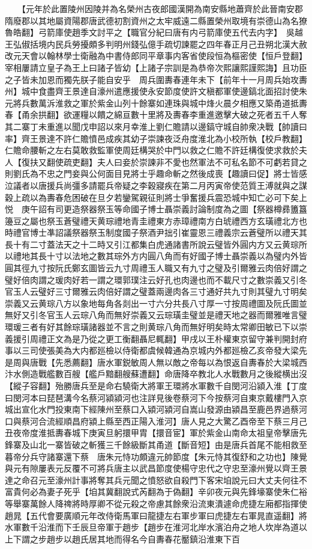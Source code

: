　　【元年於此置陵州因陵并為名榮州古夜郎國漢開為南安縣地蕭齊於此晉南安郡隋廢郡以其地屬資陽郡唐武德初割資州之太牢威遠二縣置榮州取境有崇德山為名獠魯皓翻】弓箭庫使趙季文討平之【職官分紀曰唐有内弓箭庫使五代去内字】　吳越王弘俶括境内民兵勞擾頗多判明州錢弘億手疏切諫罷之四年春正月己丑朔北漢大赦改元天會以翰林學士衛融為中書侍郎同平章事内客省使段恒為樞密使【恒戶登翻】　宰相屢請立皇子為王上曰諸子皆幼【上諸子宗訓是為恭帝次熙讓熙謹熙誨】且功臣之子皆未加恩而獨先朕子能自安乎　周兵圍夀春連年未下【前年十一月周兵始攻夀州】城中食盡齊王景達自濠州遣應援使永安節度使許文稹都軍使邊鎬北面招討使朱元將兵數萬泝淮救之軍於紫金山列十餘寨如連珠與城中烽火晨夕相應又築甬道抵夀春【甬余拱翻】欲運糧以饋之綿亘數十里將及夀春李重進邀擊大破之死者五千人奪其二寨丁未重進以聞戊申詔以來月幸淮上劉仁贍請以邊鎬守城自帥衆决戰【帥讀曰率】齊王景達不許仁贍憤邑成疾其幼子崇諫夜泛舟度淮北為小校所執【校戶教翻】仁贍命腰斬之左右莫敢救監軍使周廷構哭於中門以救之仁贍不許廷構復使求救於夫人【復扶又翻使疏吏翻】夫人曰妾於崇諫非不愛也然軍法不可私名節不可虧若貸之則劉氏為不忠之門妾與公何面目見將士乎趣命斬之然後成喪【趣讀曰促】將士皆感泣議者以唐援兵尚彊多請罷兵帝疑之李穀寢疾在第二月丙寅帝使范質王溥就與之謀穀上疏以為夀春危困破在旦夕若鑾駕親征則將士爭奮援兵震恐城中知亡必可下矣上悦　庚午詔有司更造祭器祭玉等命國子博士聶崇義討論制度為之圖【祭器樽彞簠簋籩豆之屬也祭玉蒼璧禮天黄琮禮地青圭禮東方赤璋禮南方白琥禮西方玄璜禮北方也時禮官博士凖詔議祭器祭玉制度國子祭酒尹拙引崔靈恩三禮義宗云蒼璧所以禮天其長十有二寸蓋法天之十二時又引江都集白虎通諸書所說云璧皆外圓内方又云黄琮所以禮地其長十寸以法地之數其琮外方内圓八角而有好國子博士聶崇義以為璧内外皆圓其徑九寸按阮氏鄭玄圖皆云九寸周禮玉人職又有九寸之璧及引爾雅云肉倍好謂之璧好倍肉謂之瑗肉好若一謂之環郭璞注云好孔也肉邊也而不載尺寸之數崇義又引冬官玉人云璧好三寸爾雅云肉倍好謂之璧蓋兩邊肉各三寸通好共九寸則其璧九寸明矣崇義又云黄琮八方以象地每角各剡出一寸六分共長八寸厚一寸按周禮圖及阮氏圖並無好又引冬官玉人云琮八角而無好崇義又云琮璜圭璧並是禮天地之器而爾雅唯言璧環瑗三者有好其餘琮璜諸器並不言之則黄琮八角而無好明矣時太常卿田敏已下以崇義援引周禮正文為是乃從之更工衡翻聶尼輒翻】甲戌以王朴權東京留守兼判開封府事以三司使張美為大内都廵檢以侍衛都虞候韓通為京城内外都廵檢乙亥帝發大梁先是周與唐戰【先悉薦翻】唐水軍鋭敏周人無以敵之帝每以為恨返自夀春於大梁城西汴水側造戰艦數百艘【艦戶黯翻艘蘇遭翻】命唐降卒教北人水戰數月之後縱横出沒【縱子容翻】殆勝唐兵至是命右驍衛大將軍王環將水軍數千自閔河沿潁入淮【丁度曰閔河本曰琵琶溝今名蔡河潁潁河也注詳見後卷蔡河下今按蔡河自東京戴樓門入京城出宣化水門投東南下經陳州至蔡口入潁河潁河自嵩山發源由潁昌至鹿邑界過蔡河口與蔡河合流經順昌府潁上縣至西正陽入淮河】唐人見之大驚乙酉帝至下蔡三月己丑夜帝度淮抵夀春城下庚寅旦躬擐甲胄【擐音宦】軍於紫金山南命太祖皇帝擊唐先鋒寨及山北一寨皆破之斬獲三千餘級斷其甬道【斷音短】由是唐兵首尾不能相救至暮帝分兵守諸寨還下蔡　唐朱元恃功頗違元帥節度【朱元恃其復舒和之功也】陳覺與元有隙屢表元反覆不可將兵唐主以武昌節度使楊守忠代之守忠至濠州覺以齊王景達之命召元至濠州計事將奪其兵元聞之憤怒欲自殺門下客宋垍說元曰大丈夫何往不富貴何必為妻子死乎【垍其冀翻說式芮翻為于偽翻】辛卯夜元與先鋒壕寨使朱仁裕等舉寨萬餘人降禆將時厚卿不從元殺之帝慮其餘衆沿流東潰遽命虎捷左廂都指揮使趙晁【五代會要廣順元年改侍衛馬軍曰龍捷左右軍步軍曰虎捷左右軍晁直遥翻】將水軍數千沿淮而下壬辰旦帝軍于趙步【趙步在淮河北岸水濱泊舟之地人坎岸為道以上下謂之步趙步以趙氏居其地而得名今自夀春花靨鎮沿淮東下百